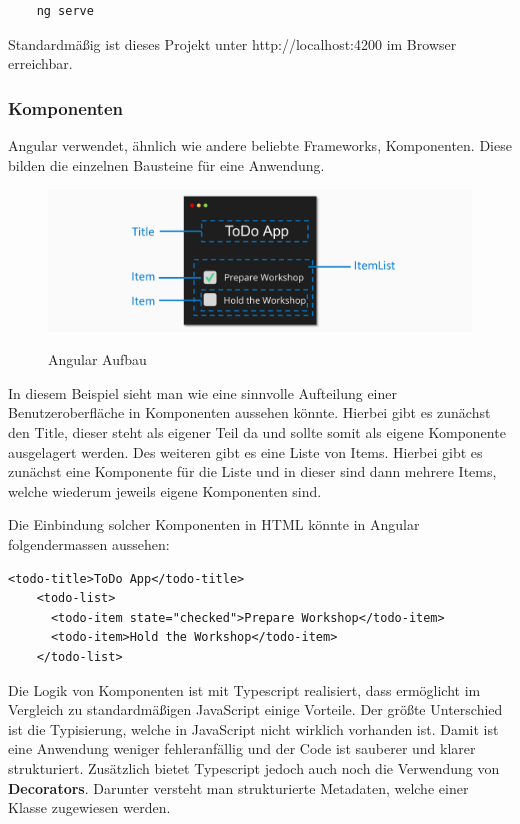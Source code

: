 \begin{lstlisting}
    ng serve
\end{lstlisting}

Standardmäßig ist dieses Projekt unter http://localhost:4200 im Browser erreichbar. 

\subsubsection{Komponenten}
Angular verwendet, ähnlich wie andere beliebte Frameworks, Komponenten. Diese bilden die einzelnen Bausteine für eine Anwendung.

\begin{figure}[h!]
    \centering
    \includegraphics[width=1\textwidth]{pics/angular-components.png }
    \caption{Angular Aufbau}
    \cite{frontend_web_angular_introduction}
    \label{fig:mesh1}
\end{figure}

In diesem Beispiel sieht man wie eine sinnvolle Aufteilung einer Benutzeroberfläche in Komponenten aussehen könnte. Hierbei gibt es zunächst den Title, dieser steht als eigener Teil da und sollte somit als eigene Komponente ausgelagert werden. Des weiteren gibt es eine Liste von Items. Hierbei gibt es zunächst eine Komponente für die Liste und in dieser sind dann mehrere Items, welche wiederum jeweils eigene Komponenten sind. 

Die Einbindung solcher Komponenten in HTML könnte in Angular folgendermassen aussehen:

\begin{lstlisting}[caption=Angular Komponenten Einbindung]
    <todo-title>ToDo App</todo-title>
    <todo-list>
      <todo-item state="checked">Prepare Workshop</todo-item>
      <todo-item>Hold the Workshop</todo-item>
    </todo-list>
\end{lstlisting}

Die Logik von Komponenten ist mit Typescript realisiert, dass ermöglicht im Vergleich zu standardmäßigen JavaScript einige Vorteile. Der größte Unterschied ist die Typisierung, welche in JavaScript nicht wirklich vorhanden ist. Damit ist eine Anwendung weniger fehleranfällig und der Code ist sauberer und klarer strukturiert. Zusätzlich bietet Typescript jedoch auch noch die Verwendung von \textbf{Decorators}. Darunter versteht man strukturierte Metadaten, welche einer Klasse zugewiesen werden.

